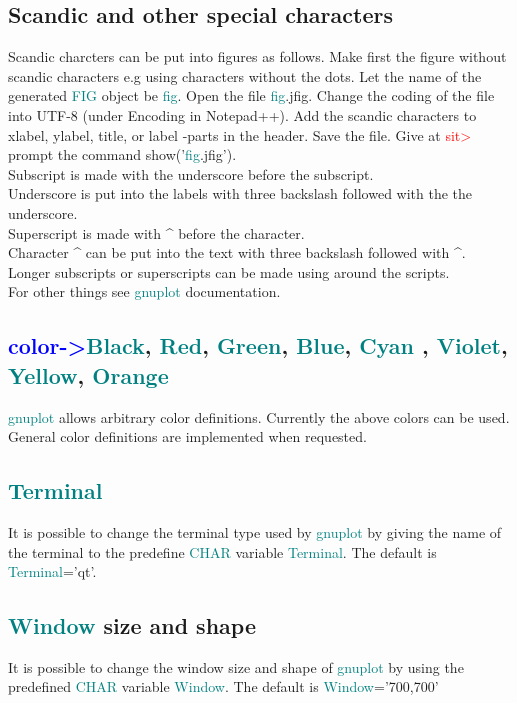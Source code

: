 \subsection{Scandic and other special characters} 
\label{gnuchar} 
Scandic charcters can be put into figures as follows. Make first the figure 
without scandic characters e.g using characters without the dots. Let the name of the generated \textcolor{teal}{FIG} object be \textcolor{teal}{fig}. 
Open the file \textcolor{teal}{fig}.jfig. Change the coding of the file into UTF-8 (under Encoding in Notepad++). 
Add the scandic characters to xlabel, ylabel, title, or label -parts in the header. 
Save the file. Give at \textcolor{Red}{sit>} prompt the command \textcolor{VioletRed}{show}('\textcolor{teal}{fig}.jfig').\\ 
Subscript is made with the underscore before the subscript.\\ 
Underscore is put into the labels with three backslash followed with the the underscore.\\ 
Superscript is made with ^ before the character.\\ 
Character ^ can be put into the text with three backslash followed with ^.\\ 
Longer subscripts or superscripts can be made using {} around the scripts.\\ 
For other things see \textcolor{teal}{gnuplot} documentation. 
\subsection{\textcolor{blue}{color->}\textcolor{teal}{Black}, \textcolor{teal}{Red}, \textcolor{teal}{Green}, \textcolor{teal}{Blue}, \textcolor{teal}{Cyan} , \textcolor{teal}{Violet}, \textcolor{teal}{Yellow}, \textcolor{teal}{Orange}} 
\label{color} 
\textcolor{teal}{gnuplot} allows arbitrary color definitions. Currently the above colors can be used. 
General color definitions are implemented  when requested. 
\subsection{\textcolor{teal}{Terminal}} 
\label{terminal} 
It is possible to change the terminal type used by \textcolor{teal}{gnuplot} by giving 
the name of the terminal to the predefine \textcolor{teal}{CHAR} variable \textcolor{teal}{Terminal}. 
The default is \newline \textcolor{teal}{Terminal}='qt'. 
\subsection{\textcolor{teal}{Window} size and shape} 
\label{window} 
It is possible to change the window size and shape of \textcolor{teal}{gnuplot} by 
using the predefined \textcolor{teal}{CHAR} variable \textcolor{teal}{Window}. 
The default is \newline 
\textcolor{teal}{Window}='700,700' 
